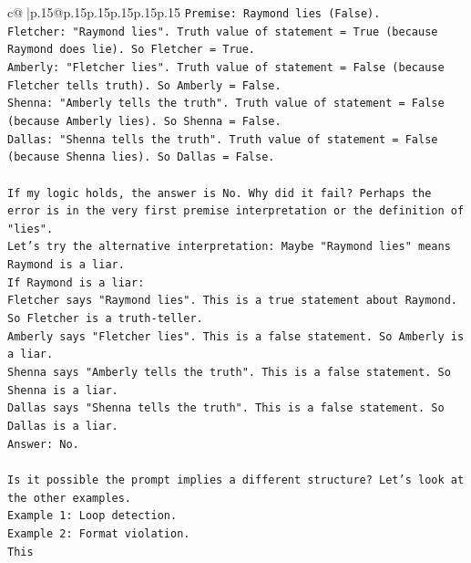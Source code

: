 \documentclass{article}
\begin{document}
{\begin{supertabular}{c@{$\;$}|p{.15\linewidth}@{}p{.15\linewidth}p{.15\linewidth}p{.15\linewidth}p{.15\linewidth}p{.15\linewidth}}
{{{\texttt{Premise: Raymond lies (False).} \\
\texttt{Fletcher: "Raymond lies". Truth value of statement = True (because Raymond does lie). So Fletcher = True.} \\
\texttt{Amberly: "Fletcher lies". Truth value of statement = False (because Fletcher tells truth). So Amberly = False.} \\
\texttt{Shenna: "Amberly tells the truth". Truth value of statement = False (because Amberly lies). So Shenna = False.} \\
\texttt{Dallas: "Shenna tells the truth". Truth value of statement = False (because Shenna lies). So Dallas = False.} \\
\\ 
\texttt{If my logic holds, the answer is No. Why did it fail? Perhaps the error is in the very first premise interpretation or the definition of "lies".} \\
\texttt{Let's try the alternative interpretation: Maybe "Raymond lies" means Raymond is a liar.} \\
\texttt{If Raymond is a liar:} \\
\texttt{Fletcher says "Raymond lies". This is a true statement about Raymond. So Fletcher is a truth{-}teller.} \\
\texttt{Amberly says "Fletcher lies". This is a false statement. So Amberly is a liar.} \\
\texttt{Shenna says "Amberly tells the truth". This is a false statement. So Shenna is a liar.} \\
\texttt{Dallas says "Shenna tells the truth". This is a false statement. So Dallas is a liar.} \\
\texttt{Answer: No.} \\
\\ 
\texttt{Is it possible the prompt implies a different structure? Let's look at the other examples.} \\
\texttt{Example 1: Loop detection.} \\
\texttt{Example 2: Format violation.} \\
\texttt{This} \\
\\ 
}}}
\end{supertabular}}
\end{document}
